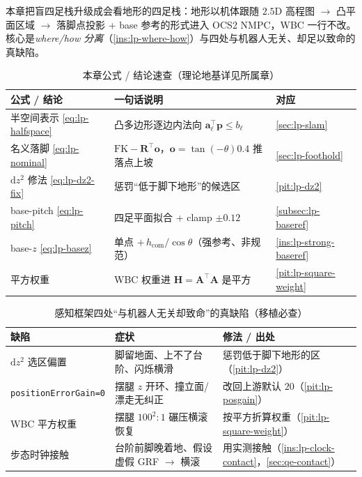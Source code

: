 本章把盲四足栈升级成会看地形的四足栈：地形以机体跟随 $2.5$D 高程图 $\to$ 凸平面区域 $\to$ 落脚点投影 + base 参考的形式进入 OCS2 NMPC，WBC 一行不改。核心是\emph{where/how 分离}（\cref{ins:lp-where-how}）与四处与机器人无关、却足以致命的真缺陷。

\begin{table}[H]\centering\small
\caption{本章公式 / 结论速查（理论地基详见所属章）}
\begin{tabular}{lll}
\toprule
公式 / 结论 & 一句话说明 & 对应 \\
\midrule
半空间表示 \cref{eq:lp-halfspace} & 凸多边形逐边内法向 $\mathbf{a}_\ell^\top\mathbf{p}\le b_\ell$ & \cref{sec:lp-slam} \\
名义落脚 \cref{eq:lp-nominal} & $\mathrm{FK}-\mathbf{R}^\top\mathbf{o}$，$\mathbf{o}=\tan(-\theta)0.4$ 推落点上坡 & \cref{sec:lp-foothold} \\
$\mathrm{d}z^2$ 修法 \cref{eq:lp-dz2-fix} & 惩罚“低于脚下地形”的候选区 & \cref{pit:lp-dz2} \\
base-pitch \cref{eq:lp-pitch} & 四足平面拟合 + clamp $\pm 0.12$ & \cref{subsec:lp-baseref} \\
base-$z$ \cref{eq:lp-basez} & 单点 $+\,h_{\mathrm{com}}/\cos\theta$（强参考、非规范）& \cref{ins:lp-strong-baseref} \\
平方权重 & WBC 权重进 $\mathbf{H}=\mathbf{A}^\top\mathbf{A}$ 是平方 & \cref{pit:lp-square-weight} \\
\bottomrule
\end{tabular}
\end{table}

\begin{table}[H]\centering\small
\caption{感知框架四处“与机器人无关却致命”的真缺陷（移植必查）}
\begin{tabular}{p{} p{} p{}}
\toprule
缺陷 & 症状 & 修法 / 出处 \\
\midrule
$\mathrm{d}z^2$ 选区偏置 & 脚留地面、上不了台阶、闪烁横滑 & 惩罚低于脚下地形的区（\cref{pit:lp-dz2}）\\
\texttt{positionErrorGain=0} & 摆腿 $z$ 开环、撞立面/漂走无纠正 & 改回上游默认 $20$（\cref{pit:lp-posgain}）\\
WBC 平方权重 & 摆腿 $100^2{:}1$ 碾压横滚恢复 & 按平方折算权重（\cref{pit:lp-square-weight}）\\
步态时钟接触 & 台阶前脚晚着地、假设虚假 GRF $\to$ 横滚 & 用实测接触（\cref{ins:lp-clock-contact}，\cref{sec:qe-contact}）\\
\bottomrule
\end{tabular}
\end{table}

